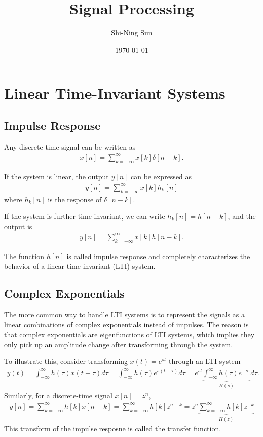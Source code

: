 \documentclass{revtex4-2}
\begin{document}
\title{Signal Processing}
\author{Shi-Ning Sun}
\date{\today}
\maketitle

\section{Linear Time-Invariant Systems}

\subsection{Impulse Response}

Any discrete-time signal can be written as
\begin{align}
    x[n] = \sum_{k=-\infty}^\infty x[k]\delta[n-k].
\end{align}

If the system is linear, the output $y[n]$ can be expressed as
\begin{align}
    y[n] = \sum_{k=-\infty}^\infty x[k] h_k[n]
\end{align}
where $h_k[n]$ is the response of $\delta[n-k]$.

If the system is further time-invariant, we can write $h_k[n] = h[n - k]$, and the output is
\begin{align}
    y[n] = \sum_{k=-\infty}^\infty x[k] h[n-k].
\end{align}

The function $h[n]$ is called impulse response and completely characterizes the behavior of 
a linear time-invariant (LTI) system.

\subsection{Complex Exponentials}

The more common way to handle LTI systems is to represent the signals as a linear combinations
of complex exponentials instead of impulses. The reason is that complex exponentials are 
eigenfunctions of LTI systems, which implies they only pick up an amplitude change after
transforming through the system. 

To illustrate this, consider transforming $x(t) = e^{st}$ through an LTI system
\begin{align}
    y(t) = \int_{-\infty}^\infty h(\tau) x(t-\tau) d\tau = \int_{-\infty}^\infty h(\tau) e^{s(t-\tau)} d\tau
    = e^{st} \underbrace{\int_{-\infty}^\infty h(\tau) e^{-s\tau}}_{H(s)} d\tau.
\end{align}
Similarly, for a discrete-time signal $x[n] = z^n$,
\begin{align}
    y[n] = \sum_{k=-\infty}^\infty h[k] x[n-k] = \sum_{k=-\infty}^\infty h[k] z^{n-k} = z^n 
    \underbrace{\sum_{k=-\infty}^\infty h[k]z^{-k}}_{H(z)}
\end{align}
This transform of the impulse resposne is called the transfer function.
\end{document}
